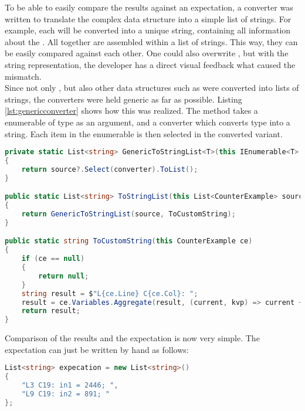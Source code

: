 To be able to easily compare the results against an expectation,
a converter was written to translate the complex data structure into a simple list of strings.
For example, each  will be converted into a unique string, containing all information about the .
All  together are assembled within a list of strings.
This way, they can be easily compared against each other.
One could also overwrite , but with the string representation, the developer has a direct visual feedback what caused the mismatch.\\

Since not only , but also other data structures such as  were converted into lists of strings,
the converters were held generic as far as possible.
Listing \ref{lst:genericconverter} shows how this was realized.
The method takes a enumerable of type  as an argument, and a converter which converts type  into a string.
Each item in the enumerable is then selected in the converted variant.

\begin{lstlisting}[language=csharp, caption={Converting CounterExamples to a List of Strings}, captionpos=b, label={lst:genericconverter}]
private static List<string> GenericToStringList<T>(this IEnumerable<T> source, Func<T, string> converter)
{
    return source?.Select(converter).ToList();
}

public static List<string> ToStringList(this List<CounterExample> source)
{
    return GenericToStringList(source, ToCustomString);
}

public static string ToCustomString(this CounterExample ce)
{
    if (ce == null)
    {
        return null;
    }
    string result = $"L{ce.Line} C{ce.Col}: ";
    result = ce.Variables.Aggregate(result, (current, kvp) => current + $"{kvp.Key} = {kvp.Value}; ");
    return result;
}
\end{lstlisting}

Comparison of the results and the expectation is now very simple.
The expectation can just be written by hand as follows:

\begin{lstlisting}[language=csharp, caption={Expectation}, captionpos=b, label={lst:testexpectation}]
List<string> expecation = new List<string>()
{
    "L3 C19: in1 = 2446; ",
    "L9 C19: in2 = 891; "
};
\end{lstlisting}

